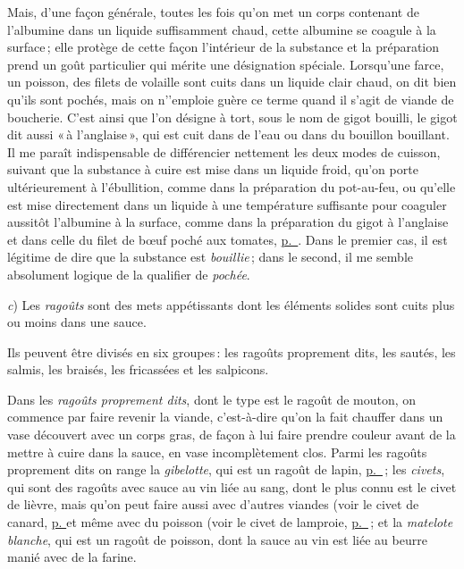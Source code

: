 Mais, d'une façon générale, toutes les fois qu'on met un corps contenant de
l'albumine dans un liquide suffisamment chaud, cette albumine se coagule à la
surface ; elle protège de cette façon l'intérieur de la substance et la
préparation prend un goût particulier qui mérite une désignation spéciale.
Lorsqu'une farce, un poisson, des filets de volaille sont cuits dans un liquide
clair chaud, on dit bien qu'ils sont pochés, mais on n’'emploie guère ce terme
quand il s'agit de viande de boucherie. C'est ainsi que l'on désigne à tort,
sous le nom de gigot bouilli, le gigot dit aussi « à l'anglaise », qui est cuit
dans de l’eau ou dans du bouillon bouillant. Il me paraît indispensable de
différencier nettement les deux modes de cuisson, suivant que la substance
à cuire est mise dans un liquide froid, qu'on porte ultérieurement
à l'ébullition, comme dans la préparation du pot-au-feu, ou qu'elle est mise
directement dans un liquide à une température suffisante pour coaguler aussitôt
l'albumine à la surface, comme dans la préparation du gigot à l'anglaise et
dans celle du filet de bœuf poché aux tomates,
\hyperlink{p0464}{p. \pageref{pg0464}}. Dans le premier cas, il est légitime de
dire que la substance est \textit{bouillie} ; dans le second, il me semble
absolument logique de la qualifier de \textit{pochée}.

\textit{c}) Les \textit{ragoûts} sont des mets appétissants dont les éléments
solides sont cuits plus ou moins dans une sauce.

Ils peuvent être divisés en six groupes : les ragoûts proprement dits, les
sautés, les salmis, les braisés, les fricassées et les salpicons.


Dans les \textit{ragoûts proprement dits}, dont le type est le ragoût de
mouton, on commence par faire revenir la viande, c'est-à-dire qu'on la fait
chauffer dans un vase découvert avec un corps gras, de façon à lui faire
prendre couleur avant de la mettre à cuire dans la sauce, en vase
incomplètement clos. Parmi les ragoûts proprement dits on range la
\textit{gibelotte}, qui est un ragoût de lapin,
\hyperlink{p0648}{p. \pageref{pg0648}} ; les \textit{civets}, qui sont des ragoûts
avec sauce au vin liée au sang, dont le plus connu est le civet de lièvre, mais
qu'on peut faire aussi avec d'autres viandes (voir le civet
de canard, \hyperlink{p0588}{p. \pageref{pg0588}} et même avec du poisson (voir le
civet de lamproie, \hyperlink{p0341}{p. \pageref{pg0341}} ; et la
\textit{matelote blanche}, qui est un ragoût de poisson, dont la sauce au vin
est liée au beurre manié avec de la farine.


